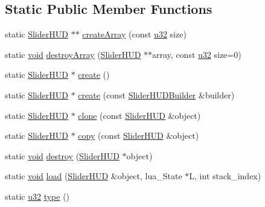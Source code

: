 \subsection*{Static Public Member Functions}
\begin{DoxyCompactItemize}
\item 
static \mbox{\hyperlink{classnjli_1_1_slider_h_u_d}{Slider\+H\+UD}} $\ast$$\ast$ \mbox{\hyperlink{classnjli_1_1_slider_h_u_d_a7c2239129d284b67553d0c6535eaed1b}{create\+Array}} (const \mbox{\hyperlink{_util_8h_a10e94b422ef0c20dcdec20d31a1f5049}{u32}} size)
\item 
static \mbox{\hyperlink{_thread_8h_af1e856da2e658414cb2456cb6f7ebc66}{void}} \mbox{\hyperlink{classnjli_1_1_slider_h_u_d_ad2a2ea86c9748a6dbbaa9fb32860be0a}{destroy\+Array}} (\mbox{\hyperlink{classnjli_1_1_slider_h_u_d}{Slider\+H\+UD}} $\ast$$\ast$array, const \mbox{\hyperlink{_util_8h_a10e94b422ef0c20dcdec20d31a1f5049}{u32}} size=0)
\item 
static \mbox{\hyperlink{classnjli_1_1_slider_h_u_d}{Slider\+H\+UD}} $\ast$ \mbox{\hyperlink{classnjli_1_1_slider_h_u_d_a39e75f82c8e15b733dd034f94d33927c}{create}} ()
\item 
static \mbox{\hyperlink{classnjli_1_1_slider_h_u_d}{Slider\+H\+UD}} $\ast$ \mbox{\hyperlink{classnjli_1_1_slider_h_u_d_ad82c56035c83ac61772fd56872575136}{create}} (const \mbox{\hyperlink{classnjli_1_1_slider_h_u_d_builder}{Slider\+H\+U\+D\+Builder}} \&builder)
\item 
static \mbox{\hyperlink{classnjli_1_1_slider_h_u_d}{Slider\+H\+UD}} $\ast$ \mbox{\hyperlink{classnjli_1_1_slider_h_u_d_a6a515652bfa2ef7926ea86b80e3f40f7}{clone}} (const \mbox{\hyperlink{classnjli_1_1_slider_h_u_d}{Slider\+H\+UD}} \&object)
\item 
static \mbox{\hyperlink{classnjli_1_1_slider_h_u_d}{Slider\+H\+UD}} $\ast$ \mbox{\hyperlink{classnjli_1_1_slider_h_u_d_a144602096b965e2b6e836e752d37e77d}{copy}} (const \mbox{\hyperlink{classnjli_1_1_slider_h_u_d}{Slider\+H\+UD}} \&object)
\item 
static \mbox{\hyperlink{_thread_8h_af1e856da2e658414cb2456cb6f7ebc66}{void}} \mbox{\hyperlink{classnjli_1_1_slider_h_u_d_a0d32698c697432a157e24ac11337f35b}{destroy}} (\mbox{\hyperlink{classnjli_1_1_slider_h_u_d}{Slider\+H\+UD}} $\ast$object)
\item 
static \mbox{\hyperlink{_thread_8h_af1e856da2e658414cb2456cb6f7ebc66}{void}} \mbox{\hyperlink{classnjli_1_1_slider_h_u_d_a4736d2eebe4afbebfddda76dfd14cce3}{load}} (\mbox{\hyperlink{classnjli_1_1_slider_h_u_d}{Slider\+H\+UD}} \&object, lua\+\_\+\+State $\ast$L, int stack\+\_\+index)
\item 
static \mbox{\hyperlink{_util_8h_a10e94b422ef0c20dcdec20d31a1f5049}{u32}} \mbox{\hyperlink{classnjli_1_1_slider_h_u_d_ad0d5a4c37308654054255e7f261364c7}{type}} ()
\end{DoxyCompactItemize}

